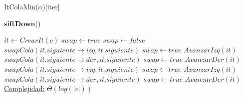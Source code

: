 \begin{Estructura}{ItColaMin($\alpha$)}[iter]
\begin{algorithm}[H]{\textbf{siftDown}()}
    	\begin{algorithmic}[1]
			\State $it \leftarrow CrearIt(c)$ 
			\State $swap \leftarrow true$
			 
				\State $swap \leftarrow false$ 
				 
					 					
						 
							\State $swapCola(it.siguiente \rightarrow izq, it.siguiente) $ 
							\State $swap \leftarrow true$ 							
							\State $AvanzarIzq(it) $ 							
						\EndIf
					\Else
						 
							\State $swapCola(it.siguiente \rightarrow der, it.siguiente) $ 
							\State $swap \leftarrow true$ 							
							\State $AvanzarDer(it) $ 							
						\EndIf
					\EndIf
				\Else
					 
						 
							\State $swapCola(it.siguiente \rightarrow izq, it.siguiente) $ 
							\State $swap \leftarrow true$ 							
							\State $AvanzarIzq(it) $ 							
						\EndIf
					\Else
						 
							\State $swapCola(it.siguiente \rightarrow der, it.siguiente) $ 
							\State $swap \leftarrow true$ 							
							\State $AvanzarDer(it) $ 							
						\EndIf
					\EndIf
				\EndIf
			\EndWhile
			\medskip
			\Statex \underline{Complejidad:} $\Theta(log(|c|))$
    	\end{algorithmic}
\end{algorithm}


\end{Estructura}

